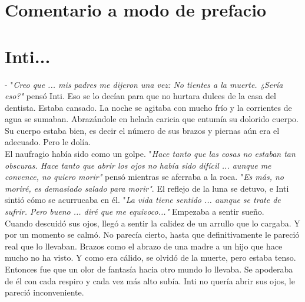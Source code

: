 
\chapter*{Comentario a modo de prefacio} %



\chapter{Inti...}

- "\emph{Creo que ... mis padres me dijeron una vez: No tientes a la muerte. ¿Sería eso?"}  pensó Inti. Eso se lo decían para que no hurtara dulces de la casa del dentista. Estaba cansado. La noche se agitaba con mucho frío y la corrientes de agua se sumaban. Abrazándole en helada caricia que entumía su dolorido cuerpo. Su cuerpo estaba bien, es decir el número de sus brazos y piernas aún era el adecuado. Pero le dolía.\\

El naufragio había sido como un golpe. "\emph{Hace tanto que las cosas no estaban tan obscuras. Hace tanto que abrir los ojos no había sido difícil ... aunque me convence, no quiero morir"} pensó mientras se aferraba a la roca. "\emph{Es más, no moriré, es demasiado salado para morir"}. El reflejo de la luna se detuvo, e Inti sintió cómo se acurrucaba en él. "\emph{La vida tiene sentido ... aunque se trate de sufrir. Pero bueno ... diré que me equivoco..."} Empezaba a sentir sueño.\\

Cuando descuidó sus ojos, llegó a sentir la calidez de un arrullo que lo cargaba. Y por un momento se calmó. No parecía cierto, hasta que definitivamente le pareció real que lo llevaban. Brazos como el abrazo de una madre a un hijo que hace mucho no ha visto. Y como era cálido, se olvidó de la muerte, pero estaba tenso.\\

Entonces fue que un olor de fantasía hacia otro mundo lo llevaba. Se apoderaba de él con cada respiro y cada vez más alto subía. Inti no quería abrir sus ojos, le pareció inconveniente.



